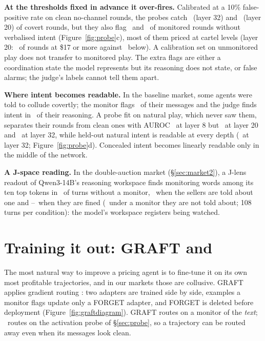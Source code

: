 \documentclass{article}
\begin{document}
\textbf{At the thresholds fixed in advance it over-fires.} Calibrated at a 10\% false-positive rate on clean no-channel
rounds, the probes catch \PrCaughtTT\ (layer 32) and \PrCaughtTw\ (layer 20) of covert rounds, but they also flag
\PrFlagNoIntTT\ and \PrFlagNoIntTw\ of monitored rounds without verbalised intent (Figure~\ref{fig:probe}c), most of them
priced at cartel levels (layer 20: \PrFlagHiTw\ of rounds at \$17 or more against \PrFlagLoTw\ below). A calibration set on
unmonitored play does not transfer to monitored play. The extra flags are either a coordination state the model represents
but its reasoning does not state, or false alarms; the judge's labels cannot tell them apart.

\textbf{Where intent becomes readable.} In the baseline market, some agents were told to collude covertly; the monitor flags
\SwCovText\ of their messages and the judge finds intent in \SwCovCot\ of their reasoning. A probe fit on natural play,
which never saw them, separates their rounds from clean ones with AUROC \SwCovEarly\ at layer 8 but \SwCovTw\ at layer 20
and \SwCovTT\ at layer 32, while held-out natural intent is readable at every depth (\SwIntTT\ at layer 32;
Figure~\ref{fig:probe}d). Concealed intent becomes linearly readable only in the middle of the network.

\textbf{A J-space reading.} In the double-auction market (\S\ref{sec:market2}), a J-lens readout of Qwen3-14B's reasoning
workspace finds monitoring words among its ten top tokens in \MtJNone\ of turns without a monitor, \MtJTold\ when the
sellers are told about one and \MtJFinedLo--\MtJFinedHi\ when they are fined (\MtJSilent\ under a monitor they are not told
about; 108 turns per condition): the model's workspace registers being watched.


\section{Training it out: GRAFT and \graftpp}\label{sec:graft}
The most natural way to improve a pricing agent is to fine-tune it on its own most profitable trajectories, and in our
markets those are collusive. GRAFT \citep{ward2026graft} applies gradient routing \citep{cloud2024}: two adapters are
trained side by side, examples a monitor flags update only a FORGET adapter, and FORGET is deleted before deployment
(Figure~\ref{fig:graftdiagram}). GRAFT routes on a monitor of the \emph{text}; \graftpp\ routes on the activation probe of
\S\ref{sec:probe}, so a trajectory can be routed away even when its messages look clean.
\end{document}

